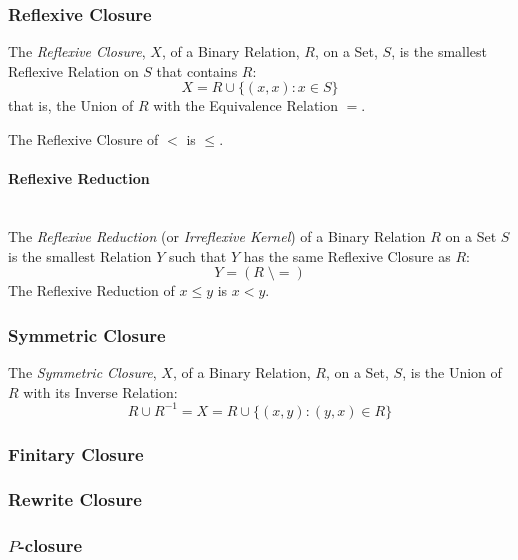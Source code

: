 \subsubsection{Reflexive Closure}\label{sec:reflexive_closure}

The \emph{Reflexive Closure}, $X$, of a Binary Relation, $R$, on a
Set, $S$, is the smallest Reflexive Relation on $S$ that contains $R$:
\[
  X = R \cup \{(x,x) : x \in S\}
\]
that is, the Union of $R$ with the Equivalence Relation $=$.

The Reflexive Closure of $<$ is $\leq$.



\paragraph{Reflexive Reduction}\label{sec:reflexive_reduction}
\hfill \\

The \emph{Reflexive Reduction} (or \emph{Irreflexive Kernel}) of a
Binary Relation $R$ on a Set $S$ is the smallest Relation $Y$ such
that $Y$ has the same Reflexive Closure as $R$:
\[
  Y = (R\;\setminus=)
\]
The Reflexive Reduction of $x \leq y$ is $x < y$.



\subsubsection{Symmetric Closure}\label{sec:symmetric_closure}

The \emph{Symmetric Closure}, $X$, of a Binary Relation, $R$, on a
Set, $S$, is the Union of $R$ with its Inverse Relation:
\[
  R \cup R^{-1} = X = R \cup \{(x,y) : (y,x) \in R\}
\]



\subsubsection{Finitary Closure}\label{sec:finitary_closure}

\subsubsection{Rewrite Closure}\label{sec:rewrite_closure}

\subsubsection{$P$-closure}\label{sec:p_closure}



